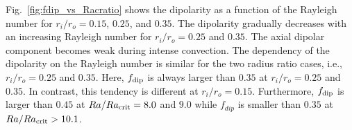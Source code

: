 {\color{blue}
%
%
%
%

Fig.~\ref{fig:fdip_vs_Racratio} shows the dipolarity as a function of the Rayleigh number for $r_i/r_o = 0.15$, $0.25$, and $0.35$. 
The dipolarity gradually decreases with an increasing Rayleigh number for $r_i/r_o = 0.25$ and $0.35$. 
The axial dipolar component becomes weak during intense convection. 
The dependency of the dipolarity on the Rayleigh number is similar for the two radius ratio cases, i.e., $r_i/r_o = 0.25$ and $0.35$. 
Here, $f_{\rm dip}$ is always larger than $0.35$ at $r_i/r_o = 0.25$ and $0.35$. 
In contrast, this tendency is different at $r_i/r_o = 0.15$. 
Furthermore, $f_{\rm dip}$ is larger than $0.45$ at $Ra/Ra_{\rm crit} = 8.0$ and $9.0$ while $f_{dip}$ is smaller than $0.35$ at $Ra/Ra_{\rm crit} > 10.1$.
}


